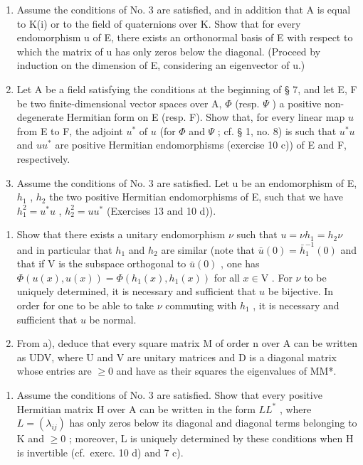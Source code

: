 \begin{enumerate}
\def\labelenumi{\arabic{enumi})}
\setcounter{enumi}{11}
\item
  Assume the conditions of No. 3 are satisfied, and in addition that A is equal to K(i) or to the field of quaternions over K. Show that for every endomorphism u of E, there exists an orthonormal basis of E with respect to which the matrix of u has only zeros below the diagonal. (Proceed by induction on the dimension of E, considering an eigenvector of u.)
\item
  Let A be a field satisfying the conditions at the beginning of § 7, and let E, F be two finite-dimensional vector spaces over A, \(\Phi\) (resp. \(\Psi\) ) a positive non-degenerate Hermitian form on E (resp. F). Show that, for every linear map \(u\) from E to F, the adjoint \(u^{*}\) of \(u\) (for \(\Phi\) and \(\Psi\) ; cf. § 1, no. 8) is such that \(u^{*}u\) and \(uu^{*}\) are positive Hermitian endomorphisms (exercise 10 c)) of E and F, respectively.
\item
  Assume the conditions of No. 3 are satisfied. Let u be an endomorphism of E, \(h_{1}\) , \(h_{2}\) the two positive Hermitian endomorphisms of E, such that we have \(h_{1}^{2}=u^{*}u\) , \(h_{2}^{2}=uu^{*}\) (Exercises 13 and 10 d)).
\end{enumerate}

\begin{enumerate}
\def\labelenumi{\alph{enumi})}
\item
  Show that there exists a unitary endomorphism \(\nu\) such that \(u = \nu h_{1} = h_{2}\nu\) and in particular that \(h_{1}\) and \(h_{2}\) are similar (note that \(\bar{u}(0) = \bar{h}_{1}^{-1}(0)\) and that if V is the subspace orthogonal to \(\bar{u}(0)\) , one has \(\Phi(u(x), u(x)) = \Phi(h_{1}(x), h_{1}(x))\) for all \(x \in \mathrm{V}\) . For \(\nu\) to be uniquely determined, it is necessary and sufficient that \(u\) be bijective. In order for one to be able to take \(\nu\) commuting with \(h_{1}\) , it is necessary and sufficient that \(u\) be normal.
\item
  From a), deduce that every square matrix M of order n over A can be written as UDV, where U and V are unitary matrices and D is a diagonal matrix whose entries are \(\geqslant 0\) and have as their squares the eigenvalues of MM*.
\end{enumerate}

\begin{enumerate}
\def\labelenumi{\arabic{enumi})}
\setcounter{enumi}{14}
\tightlist
\item
  Assume the conditions of No. 3 are satisfied. Show that every positive Hermitian matrix H over A can be written in the form \(LL^{*}\) , where \(L = (\lambda_{ij})\) has only zeros below its diagonal and diagonal terms belonging to K and \(\geqslant 0\) ; moreover, L is uniquely determined by these conditions when H is invertible (cf.~exerc. 10 d) and 7 c).
\end{enumerate}

